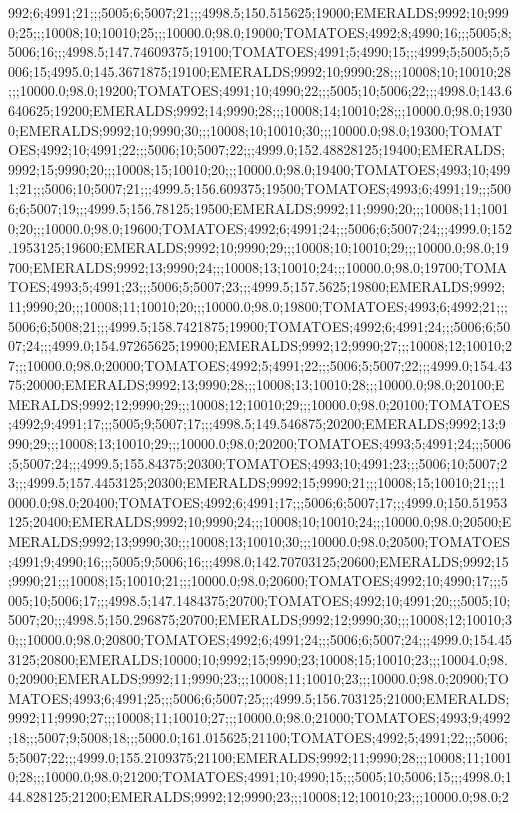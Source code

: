 992;6;4991;21;;;5005;6;5007;21;;;4998.5;150.515625;19000;EMERALDS;9992;10;9990;25;;;10008;10;10010;25;;;10000.0;98.0;19000;TOMATOES;4992;8;4990;16;;;5005;8;5006;16;;;4998.5;147.74609375;19100;TOMATOES;4991;5;4990;15;;;4999;5;5005;5;5006;15;4995.0;145.3671875;19100;EMERALDS;9992;10;9990;28;;;10008;10;10010;28;;;10000.0;98.0;19200;TOMATOES;4991;10;4990;22;;;5005;10;5006;22;;;4998.0;143.6640625;19200;EMERALDS;9992;14;9990;28;;;10008;14;10010;28;;;10000.0;98.0;19300;EMERALDS;9992;10;9990;30;;;10008;10;10010;30;;;10000.0;98.0;19300;TOMATOES;4992;10;4991;22;;;5006;10;5007;22;;;4999.0;152.48828125;19400;EMERALDS;9992;15;9990;20;;;10008;15;10010;20;;;10000.0;98.0;19400;TOMATOES;4993;10;4991;21;;;5006;10;5007;21;;;4999.5;156.609375;19500;TOMATOES;4993;6;4991;19;;;5006;6;5007;19;;;4999.5;156.78125;19500;EMERALDS;9992;11;9990;20;;;10008;11;10010;20;;;10000.0;98.0;19600;TOMATOES;4992;6;4991;24;;;5006;6;5007;24;;;4999.0;152.1953125;19600;EMERALDS;9992;10;9990;29;;;10008;10;10010;29;;;10000.0;98.0;19700;EMERALDS;9992;13;9990;24;;;10008;13;10010;24;;;10000.0;98.0;19700;TOMATOES;4993;5;4991;23;;;5006;5;5007;23;;;4999.5;157.5625;19800;EMERALDS;9992;11;9990;20;;;10008;11;10010;20;;;10000.0;98.0;19800;TOMATOES;4993;6;4992;21;;;5006;6;5008;21;;;4999.5;158.7421875;19900;TOMATOES;4992;6;4991;24;;;5006;6;5007;24;;;4999.0;154.97265625;19900;EMERALDS;9992;12;9990;27;;;10008;12;10010;27;;;10000.0;98.0;20000;TOMATOES;4992;5;4991;22;;;5006;5;5007;22;;;4999.0;154.4375;20000;EMERALDS;9992;13;9990;28;;;10008;13;10010;28;;;10000.0;98.0;20100;EMERALDS;9992;12;9990;29;;;10008;12;10010;29;;;10000.0;98.0;20100;TOMATOES;4992;9;4991;17;;;5005;9;5007;17;;;4998.5;149.546875;20200;EMERALDS;9992;13;9990;29;;;10008;13;10010;29;;;10000.0;98.0;20200;TOMATOES;4993;5;4991;24;;;5006;5;5007;24;;;4999.5;155.84375;20300;TOMATOES;4993;10;4991;23;;;5006;10;5007;23;;;4999.5;157.4453125;20300;EMERALDS;9992;15;9990;21;;;10008;15;10010;21;;;10000.0;98.0;20400;TOMATOES;4992;6;4991;17;;;5006;6;5007;17;;;4999.0;150.51953125;20400;EMERALDS;9992;10;9990;24;;;10008;10;10010;24;;;10000.0;98.0;20500;EMERALDS;9992;13;9990;30;;;10008;13;10010;30;;;10000.0;98.0;20500;TOMATOES;4991;9;4990;16;;;5005;9;5006;16;;;4998.0;142.70703125;20600;EMERALDS;9992;15;9990;21;;;10008;15;10010;21;;;10000.0;98.0;20600;TOMATOES;4992;10;4990;17;;;5005;10;5006;17;;;4998.5;147.1484375;20700;TOMATOES;4992;10;4991;20;;;5005;10;5007;20;;;4998.5;150.296875;20700;EMERALDS;9992;12;9990;30;;;10008;12;10010;30;;;10000.0;98.0;20800;TOMATOES;4992;6;4991;24;;;5006;6;5007;24;;;4999.0;154.453125;20800;EMERALDS;10000;10;9992;15;9990;23;10008;15;10010;23;;;10004.0;98.0;20900;EMERALDS;9992;11;9990;23;;;10008;11;10010;23;;;10000.0;98.0;20900;TOMATOES;4993;6;4991;25;;;5006;6;5007;25;;;4999.5;156.703125;21000;EMERALDS;9992;11;9990;27;;;10008;11;10010;27;;;10000.0;98.0;21000;TOMATOES;4993;9;4992;18;;;5007;9;5008;18;;;5000.0;161.015625;21100;TOMATOES;4992;5;4991;22;;;5006;5;5007;22;;;4999.0;155.2109375;21100;EMERALDS;9992;11;9990;28;;;10008;11;10010;28;;;10000.0;98.0;21200;TOMATOES;4991;10;4990;15;;;5005;10;5006;15;;;4998.0;144.828125;21200;EMERALDS;9992;12;9990;23;;;10008;12;10010;23;;;10000.0;98.0;2